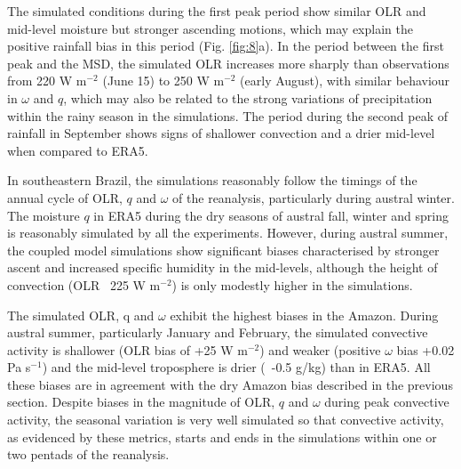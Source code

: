The simulated conditions during the first peak period show similar OLR and mid-level moisture but stronger ascending motions, which may explain the positive rainfall bias in this period (Fig. \ref{fig:8}a).
In the period between the first peak and the MSD, the simulated OLR increases more sharply than observations from 220 W m$^{-2}$ (June 15) to 250 W m$^{-2}$ (early August), with similar behaviour in $\omega$ and $q$, which may also be related to the strong variations of precipitation within the rainy season in the simulations. 
The period during the second peak of rainfall in September shows signs of shallower convection and a drier mid-level when compared to ERA5.

In southeastern Brazil, the simulations reasonably follow the timings of the annual cycle of OLR, $q$ and $\omega$ of the reanalysis, particularly during austral winter. The moisture $q$ in ERA5 during  the dry seasons of austral fall, winter and spring is reasonably simulated by all the experiments. However, during austral summer, the coupled model simulations show significant biases characterised by stronger ascent and increased specific humidity in the mid-levels, although the height of convection (OLR~ 225 W m$^{-2}$) is only modestly higher in the simulations.

The simulated OLR, q and $\omega$ exhibit the highest biases in the Amazon. During austral summer, particularly January and February, the simulated convective activity is shallower (OLR bias of +25 W m$^{-2}$) and weaker (positive $\omega$ bias +0.02 Pa s$^{-1}$) and the mid-level troposphere is drier (~-0.5 g/kg) than in ERA5. All these biases are in agreement with the dry Amazon bias described in the previous section. Despite biases in the magnitude of OLR, $q$ and $\omega$ during peak convective activity, the seasonal variation is very well simulated so that convective activity, as evidenced by these metrics, starts and ends in the simulations within one or two pentads of the reanalysis. 

